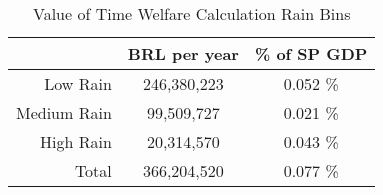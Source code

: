 \captionsetup{labelsep=newline}
\begin{table}[!htbp]
\centering

\caption{Value of Time Welfare Calculation \newline Rain Bins}
\label{table:VOT-rain}

 \begin{tabular}{r c c}
    \hline
    \hline
     & BRL per year & \% of SP GDP\\
     \hline
     Low Rain & 246,380,223 & 0.052 \%\\ 
     Medium Rain & 99,509,727 & 0.021 \% \\
     High Rain & 20,314,570 & 0.043 \% \\
     \hline
     Total & 366,204,520 & 0.077 \% \\
     \hline
     \hline
     \end{tabular}
     
\end{table}